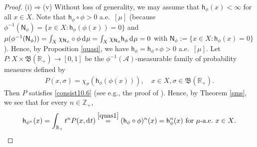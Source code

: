 \documentclass[draft,reqno]{amsproc}
\numberwithin{equation}{section}
\theoremstyle{remark}
\theoremstyle{definition}
\begin{document}
\begin{proof}
(i)$\Rightarrow$(v) Without loss of generality, we may
assume that ${\mathsf h}_{\phi}(x) < \infty$ for all $x\in
X$. Note that ${\mathsf h}_{\phi} \circ \phi > 0$ a.e.\
$[\mu]$ (because $\phi^{-1}({\mathsf{N}}_\phi) = \{x \in X
\colon {\mathsf h}_\phi (\phi (x))=0\}$ and
$\mu(\phi^{-1}({\mathsf{N}}_\phi)) = \int_X \chi_{{\mathsf{N}}_\phi}
\circ \phi \operatorname{d\hspace{-0.25ex}} \mu = \int_X \chi_{{\mathsf{N}}_\phi} {\mathsf h}_\phi
\operatorname{d\hspace{-0.25ex}} \mu = 0$ with ${\mathsf{N}}_\phi:=\{x \in X \colon
{\mathsf h}_\phi(x)=0\}$). Hence, by Proposition \ref{quasi},
we have ${\mathsf h}_{\phi} = {\mathsf h}_{\phi} \circ \phi > 0$
a.e.\ $[\mu]$. Let $P\colon X \times {{\mathfrak B}({{\mathbb R}_+})}
\to [0,1]$ be the $\phi^{-1}({\mathscr A})$-measurable family
of probability measures defined by
   \begin{align}  \label{quas1}
P(x,\sigma) = \chi_{\sigma}({\mathsf h}_{\phi}(\phi(x))),
\quad x\in X, \sigma \in {{\mathfrak B}({{\mathbb R}_+})}.
   \end{align}
Then $P$ satisfies \eqref{consist10.6} (see e.g., the
proof of \cite[Proposition 3.6]{b-j-j-sD}). Hence, by
Theorem \ref{sms}, we see that for every $n\in
{\mathbb Z}_+$,
   \begin{align*}
{\mathsf h}_{\phi^n}(x) = \int_{{\mathbb R}_+} t^n P(x,\operatorname{d\hspace{-0.25ex}} t)
\overset{\eqref{quas1}}= ({\mathsf h}_{\phi} \circ \phi)^n
(x) = {\mathsf h}_{\phi}^n (x) \text{ for $\mu$-a.e.\ $x\in
X$.}
   \end{align*}


\end{proof}
\end{document}
